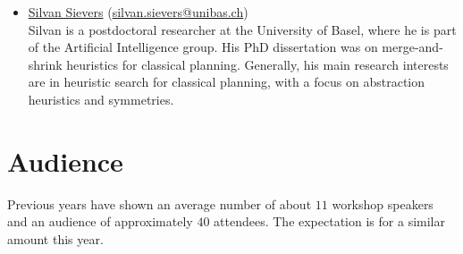 \documentclass[10pt]{article}
\begin{document}
\begin{itemize}





\item \href{http://ai.cs.unibas.ch/people/}{Silvan Sievers}
  (\href{mailto:silvan.sievers@unibas.ch}{silvan.sievers@unibas.ch})\\
Silvan is a postdoctoral researcher at the University of Basel, where he is
part of the Artificial Intelligence group. His PhD dissertation was on
merge-and-shrink heuristics for classical planning. Generally, his main
research interests are in heuristic search for classical planning, with a focus
on abstraction heuristics and symmetries.



\end{itemize}

\section*{Audience}
Previous years have shown an average number of about $11$ workshop
speakers and an audience of approximately $40$ attendees. The
expectation is for a similar amount this year.
\end{document}

